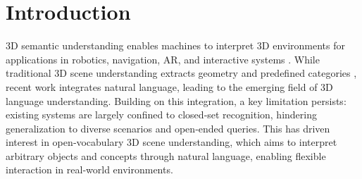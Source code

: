 \documentclass[runningheads]{llncs}
\begin{document}
\section{Introduction}
\label{sec:intro}
3D semantic understanding enables machines to interpret 3D environments for applications in robotics, navigation, AR, and interactive systems \cite{rosinol20203d,tian2024drivevlm,zhou2020cylinder3d}. While traditional 3D scene understanding extracts geometry and predefined categories \cite{dai2017scannet,yeshwanth2023scannet++,gupta2015indoor}, recent work integrates natural language\cite{jiang2024open}, leading to the emerging field of 3D language understanding. 
Building on this integration, a key limitation persists: existing systems are largely confined to closed‑set recognition, hindering generalization to diverse scenarios and open‑ended queries. This has driven interest in open‑vocabulary 3D scene understanding, which aims to interpret arbitrary objects and concepts through natural language, enabling flexible interaction in real‑world environments.
\end{document}

